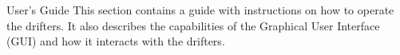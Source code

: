 \begin{customAppendixPage}{User's Guide}
\label{sec:usersGuide}
This section contains a guide with instructions on how to operate the drifters.  It also describes the capabilities of the Graphical User Interface (GUI) and how it interacts with the drifters.
\end{customAppendixPage}
\renewcommand*{\thepage}{\thesection-\arabic{page}}